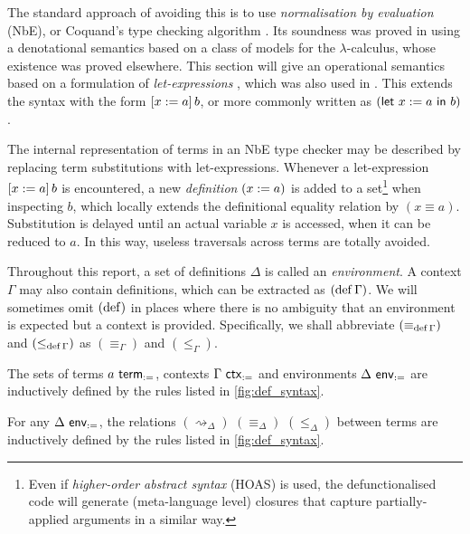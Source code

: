 \documentclass[twoside]{report}
\begin{document}
The standard approach of avoiding this is to use \emph{normalisation by evaluation} (NbE), or Coquand's type checking algorithm \cite{coquand1996algorithm}. Its soundness was proved in \cite{coquand1996algorithm} using a denotational semantics based on a class of models for the $\lambda$-calculus, whose existence was proved elsewhere. This section will give an operational semantics based on a formulation of \emph{let-expressions} \cite{severi1994pure}, which was also used in \cite{mcbride2000dependently}. This extends the syntax with the form $[{x}:={a}]\,{b}$, or more commonly written as $(\mathsf{let}\ x := a\ \mathsf{in}\ b)$.

The internal representation of terms in an NbE type checker may be described by replacing term substitutions with let-expressions. Whenever a let-expression $[{x}:={a}]\,{b}$ is encountered, a new \emph{definition} $(x := a)$ is added to a set\footnote{Even if \emph{higher-order abstract syntax} (HOAS) is used, the defunctionalised code will generate (meta-language level) closures that capture partially-applied arguments in a similar way.} when inspecting $b$, which locally extends the definitional equality relation by $(x \equiv a)$. Substitution is delayed until an actual variable $x$ is accessed, when it can be reduced to $a$. In this way, useless traversals across terms are totally avoided.

Throughout this report, a set of definitions $\Delta$ is called an \emph{environment}. A context $\Gamma$ may also contain definitions, which can be extracted as $(\operatorname{def} \Gamma)$. We will sometimes omit $(\operatorname{def})$ in places where there is no ambiguity that an environment is expected but a context is provided. Specifically, we shall abbreviate $(\equiv_{\operatorname{def} \Gamma})$ and $(\leq_{\operatorname{def} \Gamma})$ as $(\equiv_\Gamma)$ and $(\leq_\Gamma)$.

\begin{definition}[Syntax]
\label{def:def_syntax}
The sets of terms $a \ \mathsf{term}_{:=}$, contexts $\Gamma \ \mathsf{ctx}_{:=}$ and environments $\Delta \ \mathsf{env}_{:=}$ are inductively defined by the rules listed in \cref{fig:def_syntax}.
\end{definition}

\begin{definition}
\label{def:def_conversion}
For any $\Delta \ \mathsf{env}_{:=}$, the relations $(\rightsquigarrow_\Delta)$ $(\equiv_\Delta)$ $(\leq_\Delta)$ between terms are inductively defined by the rules listed in \cref{fig:def_syntax}.
\end{definition}
\end{document}
